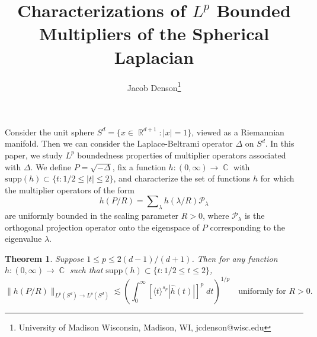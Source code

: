 \documentclass[dvipsnames,letterpaper,12pt]{article}
\title{Characterizations of $L^p$ Bounded Multipliers of the Spherical Laplacian}
\author{Jacob Denson\footnote{University of Madison Wisconsin, Madison, WI, jcdenson@wisc.edu}}
\DeclareMathOperator{\RR}{\mathbb{R}}
\DeclareMathOperator{\CC}{\mathbb{C}}
\newtheorem{theorem}{Theorem}
\begin{document}
\maketitle

Consider the unit sphere $S^d = \{ x \in \RR^{d+1} : |x| = 1 \}$, viewed as a Riemannian manifold. Then we can consider the Laplace-Beltrami operator $\Delta$ on $S^d$. In this paper, we study $L^p$ boundedness properties of multiplier operators associated with $\Delta$. We define $P = \sqrt{-\Delta}$, fix a function $h: (0,\infty) \to \CC$ with $\text{supp}(h) \subset \{ t: 1/2 \leq |t| \leq 2 \}$, and characterize the set of functions $h$ for which the multiplier operators of the form
%
\[ h \left( P / R \right) = \sum\nolimits_\lambda h(\lambda / R) \mathcal{P}_\lambda \]
%
are uniformly bounded in the scaling parameter $R > 0$, where $\mathcal{P}_\lambda$ is the orthogonal projection operator onto the eigenspace of $P$ corresponding to the eigenvalue $\lambda$.

\begin{theorem} \label{mainTheorem}
    Suppose $1 \leq p \leq 2(d-1)/(d+1)$. Then for any function $h: (0,\infty) \to \CC$ such that $\text{supp}(h) \subset \{ t : 1/2 \leq t \leq 2 \}$,
    \[ \| h(P/R) \|_{L^p(S^d) \to L^p(S^d)} \lesssim \left( \int_0^\infty \left[ \langle t \rangle^{s_p} |\widehat{h}(t)| \right]^p\; dt \right)^{1/p} \quad\text{uniformly for $R > 0$}. \]
\end{theorem}
\end{document}
